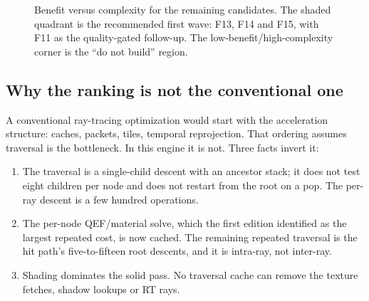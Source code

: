 \documentclass[11pt,a4paper]{article}
\theoremstyle{plain}
\theoremstyle{definition}
\theoremstyle{remark}
\begin{document}
\begin{figure}[t]
\centering
{}
\caption{Benefit versus complexity for the remaining candidates. The shaded
quadrant is the recommended first wave: F13, F14 and F15, with F11 as the
quality-gated follow-up. The low-benefit/high-complexity corner is the ``do not
build'' region.}
\label{fig:scatter}
\end{figure}

\subsection{Why the ranking is not the conventional one}

A conventional ray-tracing optimization would start with the acceleration
structure: caches, packets, tiles, temporal reprojection. That ordering assumes
traversal is the bottleneck. In this engine it is not. Three facts invert it:

\begin{enumerate}[leftmargin=1.4em,itemsep=1pt]
\item The traversal is a single-child descent with an ancestor stack; it does
      not test eight children per node and does not restart from the root on a
      pop. The per-ray descent is a few hundred operations.
\item The per-node QEF/material solve, which the first edition identified as
      the largest repeated cost, is now cached. The remaining repeated
      traversal is the hit path's five-to-fifteen root descents, and it is
      intra-ray, not inter-ray.
\item Shading dominates the solid pass. No traversal cache can remove the
      texture fetches, shadow lookups or RT rays.
\end{enumerate}
\end{document}
